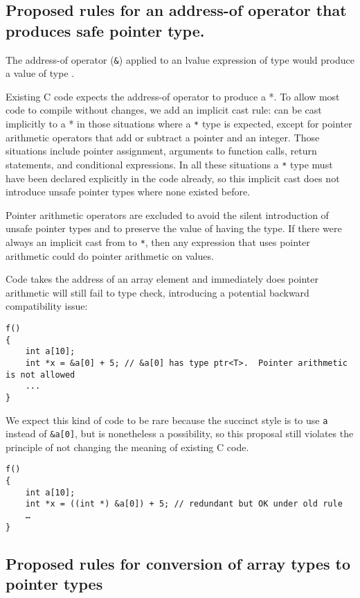 \subsection{Proposed rules for an address-of operator that produces safe pointer type.}

The address-of operator (\texttt{\&}) applied to an lvalue expression of
type  would produce a value of type
\ptrT.

Existing C code expects the address-of operator to produce a  *.
To allow most code to compile without changes, we add an implicit cast
rule: \ptrT can be cast
implicitly to a  * in those situations where a 
\texttt{*} type is expected, except for pointer arithmetic operators
that add or subtract a pointer and an integer. Those situations include
pointer assignment, arguments to function calls, return statements, and
conditional expressions. In all these situations a  \texttt{*}
type must have been declared explicitly in the code already, so this
implicit cast does not introduce unsafe pointer types where none existed
before.

Pointer arithmetic operators are excluded to avoid the silent
introduction of unsafe pointer types and to preserve the value of having
the \ptrT type. If
there were always an implicit cast from \ptrT to  \texttt{*},
then any expression that uses pointer arithmetic could do pointer
arithmetic on \ptrT
values.

Code takes the address of an array element and immediately does pointer
arithmetic will still fail to type check, introducing a potential
backward compatibility issue:
\begin{verbatim}
f()
{
    int a[10];
    int *x = &a[0] + 5; // &a[0] has type ptr<T>.  Pointer arithmetic is not allowed
    ...
}
\end{verbatim}

We expect this kind of code to be rare because the succinct style is to
use \texttt{a} instead of \texttt{\&a[0]}, but is nonetheless a
possibility, so this proposal still violates the principle of not
changing the meaning of existing C code.

\begin{verbatim}
f()
{
    int a[10];
    int *x = ((int *) &a[0]) + 5; // redundant but OK under old rule
    …
}
\end{verbatim}

\subsection{Proposed rules for conversion of array types to pointer types}

